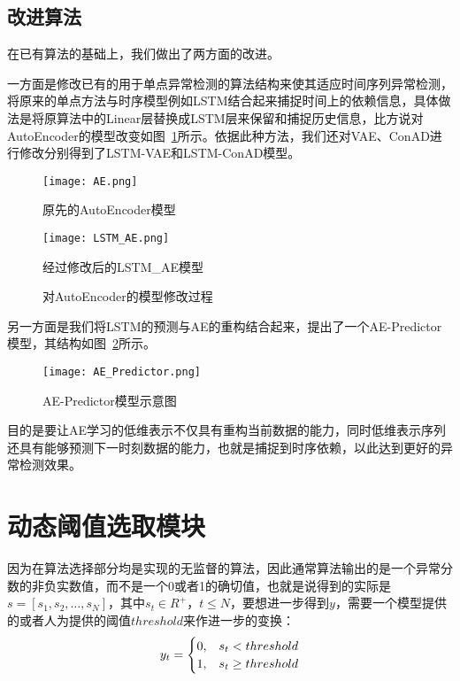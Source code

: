 \subsection{改进算法}
在已有算法的基础上，我们做出了两方面的改进。

一方面是修改已有的用于单点异常检测的算法结构来使其适应时间序列异常检测，将原来的单点方法与时序模型例如LSTM结合起来捕捉时间上的依赖信息，具体做法是将原算法中的Linear层替换成LSTM层来保留和捕捉历史信息，比方说对AutoEncoder的模型改变如图~\ref{fig:lstm_ae}所示。依据此种方法，我们还对VAE、ConAD进行修改分别得到了LSTM-VAE和LSTM-ConAD模型。

\begin{figure}[htbp]
  \begin{minipage}[t]{0.5\linewidth}
  \centering
  \texttt{[image: AE.png]}
  \caption*{原先的AutoEncoder模型}
  \end{minipage}
  \begin{minipage}[t]{0.5\linewidth}
  \centering
  \texttt{[image: LSTM\_AE.png]}
  \caption*{经过修改后的LSTM\_AE模型}
  \end{minipage}
  \caption{对AutoEncoder的模型修改过程}
  \label{fig:lstm_ae}
\end{figure}

另一方面是我们将LSTM的预测与AE的重构结合起来，提出了一个AE-Predictor模型，其结构如图~\ref{fig:AE-Predictor}所示。

\begin{figure}[htbp]
  \centering
  \texttt{[image: AE\_Predictor.png]}
  \caption{AE-Predictor模型示意图}
  \label{fig:AE-Predictor}
\end{figure}

目的是要让AE学习的低维表示不仅具有重构当前数据的能力，同时低维表示序列还具有能够预测下一时刻数据的能力，也就是捕捉到时序依赖，以此达到更好的异常检测效果。

\section{动态阈值选取模块}
因为在算法选择部分均是实现的无监督的算法，因此通常算法输出的是一个异常分数的非负实数值，而不是一个0或者1的确切值，也就是说得到的实际是$s = [s_1, s_2,\dots,s_N]$，其中$s_t\in R^+$，$t\leq N$，要想进一步得到$y$，需要一个模型提供的或者人为提供的阈值$threshold$来作进一步的变换：
\begin{equation*}
  y_t = \begin{cases}
    0, & s_t < threshold \cr
    1, & s_t \geq threshold
  \end{cases}
\end{equation*}


